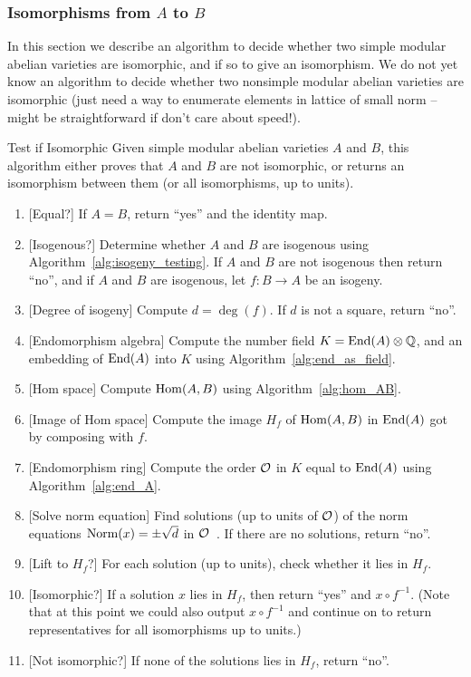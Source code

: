 \documentclass{article}
\begin{document}
\subsubsection{Isomorphisms from $A$ to $B$}

In this section we describe an algorithm to decide whether two simple
modular abelian varieties are isomorphic, and if so to give an
isomorphism.  We do not yet know an algorithm to decide whether two
nonsimple modular abelian varieties are isomorphic (just need a way
to enumerate elements in lattice of small norm -- might be straightforward
if don't care about speed!).


\begin{algorithm}{Test if Isomorphic}\label{alg:isom}
    Given simple modular abelian varieties $A$ and $B$,
    this algorithm either proves that $A$ and $B$ are not isomorphic,
    or returns an isomorphism between them (or all isomorphisms,
    up to units).

    \begin{enumerate}
        \item{}[Equal?] If $A=B$, return ``yes'' and the identity map.
        \item{}[Isogenous?]  Determine whether $A$ and $B$ are isogenous using
            Algorithm~\ref{alg:isogeny_testing}.
            If $A$ and $B$ are not isogenous then return ``no'', and if
            $A$ and $B$ are isogenous, let $f: B \to A$ be an isogeny.
        \item{}[Degree of isogeny]  Compute $d = \deg(f)$. If $d$ is not a square, return ``no''.
        \item{}[Endomorphism algebra]
            Compute the number field $K=\operatorname{End}(A)\otimes\mathbb{Q}$, and
            an embedding of $\operatorname{End}(A)$ into $K$ using
            Algorithm~\ref{alg:end_as_field}.
        \item{}[Hom space] Compute $\operatorname{Hom}(A,B)$ using Algorithm~\ref{alg:hom_AB}.
        \item{}[Image of Hom space]  Compute the image $H_f$ of $\operatorname{Hom}(A,B)$ in $\operatorname{End}(A)$
            got by composing with $f$.
        \item{}[Endomorphism ring] Compute the order $\mathcal{O}$ in $K$ equal to $\operatorname{End}(A)$
            using Algorithm~\ref{alg:end_A}.
        \item{}[Solve norm equation] Find solutions (up to units of $\mathcal{O}$) of the norm equations
            $\operatorname{Norm}(x) = \pm \sqrt{d}$ in $\mathcal{O}$~\cite[\S 5.3,
            6.4]{pohst-zassenhaus:algorithmic}. If there are no solutions, return ``no''.
        \item{}[Lift to $H_f$?]   For each solution (up to units), check whether it lies in $H_f$.
        \item{}[Isomorphic?]   If a solution $x$ lies in $H_f$, then return ``yes'' and $x\circ f^{-1}$.
            (Note that at this point we could also output $x\circ f^{-1}$ and continue
            on to return representatives for all isomorphisms up to units.)

        \item{}[Not isomorphic?]   If none of the solutions lies in $H_f$, return ``no''.
    \end{enumerate}
\end{algorithm}
\end{document}
